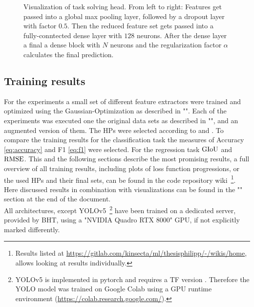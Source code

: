 \begin{figure}[!ht]
    \centering
    \caption{Visualization of task solving head. From left to right: Features get passed into a global max pooling layer, followed by a dropout layer with factor $0.5$. Then the reduced feature set gets passed into a fully-conntected dense layer with $128$ neurons. After the dense layer a final a dense block with  $N$ neurons and the regularization factor $\alpha$ calculates the final prediction.}
    \label{fig:heads}
\end{figure}
\subsection{Training results}\label{subsec:training-results}
For the experiments a small set of different feature extractors were trained and optimized using the Gaussian-Optimization as described in "".
Each of the experiments was executed one the original data sets as described in "", and an augmented version of them.
The HPs were selected according to  and .
To compare the training results for the classification task the measures of Accuracy \eqref{eq:accuracy} and F1 \eqref{eq:f1} were selected.
For the regression task $\text{GIoU}$ and $\text{RMSE}$.
This and the following sections describe the most promising results, a full overview of all training results, including plots of loss function progressions, or the used HPs and their final sets, can be found in the code repository wiki~\footnote{Results listed at \url{https://gitlab.com/kinsecta/ml/thesisphilipp/-/wikis/home}, allows looking at results individually.}.
Here discussed results in combination with visualizations can be found in the "" section at the end of the document.\\
All architectures, except YOLOv5~\footnote{YOLOv5 is implemented in pytorch and requires a TF version . Therefore the YOLO model was trained on Google Colab using a GPU runtime environment (\url{https://colab.research.google.com/}).} have been trained on a dedicated server, provided by BHT, using a "NVIDIA Quadro RTX 8000" GPU, if not explicitly marked differently.

